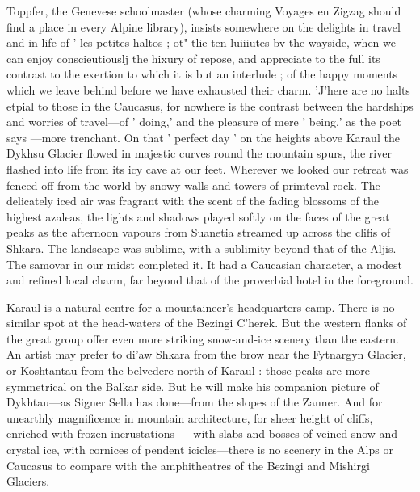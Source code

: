 \documentclass[25pt, a4paper]{article}
\begin{document}
	Toppfer, the Genevese schoolmaster (whose charming Voyages en Zigzag should find a place in every Alpine library), insists somewhere on the delights in travel and in life of ' les petites haltos ; ot" tlie ten luiiiutes bv the wayside, when we can enjoy conscieutiouslj the hixury of repose, and appreciate to the full its contrast to the exertion to which it is but an interlude ; of the happy moments which we leave behind before we have exhausted their charm. 'J'here are no halts etpial to those in the Caucasus, for nowhere is the contrast between the hardships and worries of travel—of ' doing,' and the pleasure of mere ' being,' as the poet says —more trenchant. On that ' perfect day ' on the heights above Karaul the Dykhsu Glacier flowed in majestic curves round the mountain spurs, the river flashed into life from its icy cave at our feet. Wherever we looked our retreat was fenced off from the world by snowy walls and towers of primteval rock. The delicately iced air was fragrant with the scent of the fading blossoms of the highest azaleas, the lights and shadows played softly on the faces of the great peaks as the afternoon vapours from Suanetia streamed up across the clifis of Shkara. The landscape was sublime, with a sublimity beyond that of the Aljis. The samovar in our midst completed it. It had a Caucasian character, a modest and refined local charm, far beyond that of the proverbial hotel in the foreground.
	
	Karaul is a natural centre for a mountaineer's headquarters camp. There is no similar spot at the head-waters of the Bezingi C'herek. But the western flanks of the great group offer even more striking snow-and-ice scenery than the eastern. An artist may prefer to di'aw Shkara from the brow near the Fytnargyn Glacier, or Koshtantau from the belvedere north of Karaul : those peaks are more symmetrical on the Balkar side. But he will make his companion picture of Dykhtau—as Signer Sella has done—from the slopes of the Zanner. And for unearthly magnificence in mountain architecture, for sheer height of cliffs, enriched with frozen incrustations — with slabs and bosses of veined snow and crystal ice, with cornices of pendent icicles—there is no scenery in the Alps or Caucasus to compare with the amphitheatres of the Bezingi and Mishirgi Glaciers.
	
\end{document}

